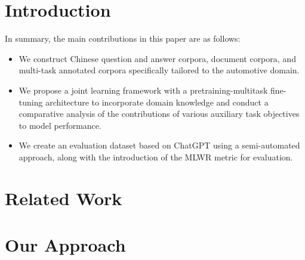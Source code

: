 \documentclass[mathematics,article,submit,moreauthors]{Definitions/mdpi}
\newcommand{\1}[1]{\mathds{1}\left[#1\right]}
\begin{document}

\section{Introduction}
\label{sec:intro}

In summary, the main contributions in this paper are as follows:
\begin{itemize}
	\item We construct Chinese question and answer corpora, document corpora, and multi-task annotated corpora specifically tailored to the automotive domain.
	\item We propose a joint learning framework with a pretraining-multitask fine-tuning architecture to incorporate domain knowledge and conduct a comparative analysis of the contributions of various auxiliary task objectives to model performance.
	\item We create an evaluation dataset based on ChatGPT using a semi-automated approach, along with the introduction of the MLWR metric for evaluation.
\end{itemize}

\section{Related Work}
\label{sec:related}


\section{Our Approach}
\end{document}
